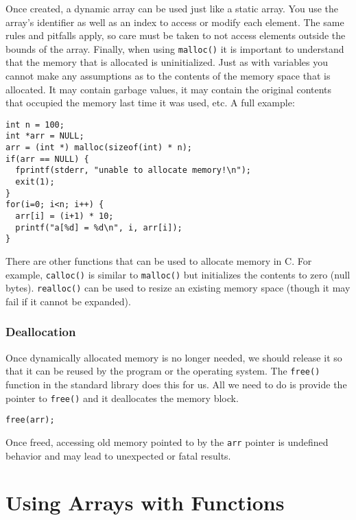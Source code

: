 Once created, a dynamic array can be used just like a static
array.  You use the array's identifier as well as an index to
access or modify each element.  The same rules and pitfalls
apply, so care must be taken to not access elements outside
the bounds of the array.  Finally, when using \texttt{malloc()}
it is important to understand that the memory that is allocated
is uninitialized.  Just as with variables you cannot make any
assumptions as to the contents of the memory space that is
allocated.  It may contain garbage values, it may contain the
original contents that occupied the memory last time it was used, 
etc.  A full example:

\begin{verbatim}
int n = 100;
int *arr = NULL;
arr = (int *) malloc(sizeof(int) * n);
if(arr == NULL) {
  fprintf(stderr, "unable to allocate memory!\n");
  exit(1);
}
for(i=0; i<n; i++) {
  arr[i] = (i+1) * 10;
  printf("a[%d] = %d\n", i, arr[i]);
}
\end{verbatim}

There are other functions that can be used to allocate memory
in C.  For example, \texttt{calloc()} is similar to 
\texttt{malloc()} but initializes the contents
to zero (null bytes).  \texttt{realloc()} can be used to resize
an existing memory space (though it may fail if it cannot be 
expanded).  

\subsubsection{Deallocation}

Once dynamically allocated memory is no longer needed, we 
should release it so that it can be reused by the program or the
operating system.  The \texttt{free()} function in the
standard library does this for us.  All we need to do is provide
the pointer to \texttt{free()} and it deallocates the
memory block.

\begin{verbatim}
free(arr);
\end{verbatim}

Once freed, accessing old memory pointed to by the \texttt{arr}
pointer is undefined behavior and may lead to unexpected or fatal
results.  

\section{Using Arrays with Functions}

